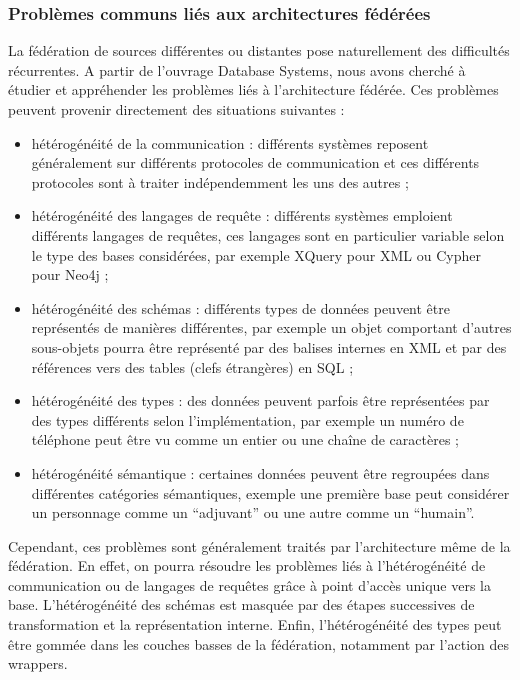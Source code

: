 \subsubsection{Problèmes communs liés aux architectures fédérées}

La fédération de sources différentes ou distantes pose naturellement des difficultés récurrentes. A partir de l’ouvrage Database Systems, nous avons cherché à étudier et appréhender les problèmes liés à l’architecture fédérée. Ces problèmes peuvent provenir directement des situations suivantes :

\begin{itemize}
    \item hétérogénéité de la communication : différents systèmes reposent généralement sur différents protocoles de communication et ces différents protocoles sont à traiter indépendemment les uns des autres ;
    \item hétérogénéité des langages de requête : différents systèmes emploient différents langages de requêtes, ces langages sont en particulier variable selon le type des bases considérées, par exemple XQuery pour XML ou Cypher pour Neo4j ;
    \item hétérogénéité des schémas : différents types de données peuvent être représentés de manières différentes, par exemple un objet comportant d’autres sous-objets pourra être représenté par des balises internes en XML et par des références vers des tables (clefs étrangères) en SQL ;
    \item  hétérogénéité des types : des données peuvent parfois être représentées par des types différents selon l’implémentation, par exemple un numéro de téléphone peut être vu comme un entier ou une chaîne de caractères ;
    \item hétérogénéité sémantique : certaines données peuvent être regroupées dans différentes catégories sémantiques, exemple une première base peut considérer un personnage comme un “adjuvant” ou une autre comme un “humain”.
\end{itemize}

Cependant, ces problèmes sont généralement traités par l’architecture même de la fédération. En effet, on pourra résoudre les problèmes liés à l’hétérogénéité de communication ou de langages de requêtes grâce à point d’accès unique vers la base. L’hétérogénéité des schémas est masquée par des étapes successives de transformation et la représentation interne. Enfin, l’hétérogénéité des types peut être gommée dans les couches basses de la fédération, notamment par l’action des wrappers.


